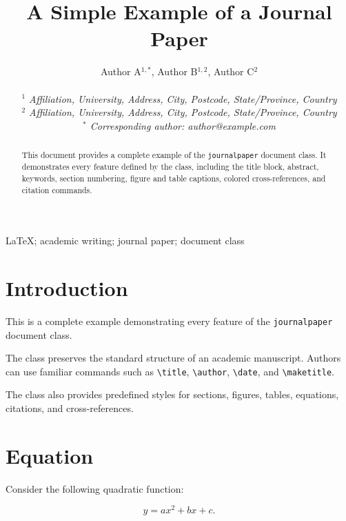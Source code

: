 \documentclass[11pt]{../class/journalpaper}
\title{A Simple Example of a Journal Paper}
\author{
    Author A$^{1,*}$, Author B$^{1,2}$, Author C$^{2}$
    \\ [8pt]
    \small
    \parbox{0.95\linewidth}{
        \centering
        $^{1}$ \itshape Affiliation, University, Address, City, Postcode, State/Province, Country
        \\
        $^{2}$ \itshape Affiliation, University, Address, City, Postcode, State/Province, Country
        \\
        $^{*}$ Corresponding author: author@example.com
    }
}
\date{}
\begin{document}
\maketitle

\begin{abstract}
This document provides a complete example of the
\texttt{journalpaper} document class. It demonstrates every
feature defined by the class, including the title block,
abstract, keywords, section numbering, figure and table
captions, colored cross-references, and citation commands.
\end{abstract}

\begin{keywords}
LaTeX; academic writing; journal paper; document class
\end{keywords}



\section{Introduction}

This is a complete example demonstrating every feature of the
\texttt{journalpaper} document class.

The class preserves the standard structure of an academic
manuscript. Authors can use familiar commands such as
\verb|\title|, \verb|\author|, \verb|\date|, and
\verb|\maketitle|.

The class also provides predefined styles for sections,
figures, tables, equations, citations, and cross-references.



\section{Equation}

Consider the following quadratic function:

\begin{equation}
    y = ax^2 + bx + c.
    \label{eq:quadratic}
\end{equation}
\end{document}
